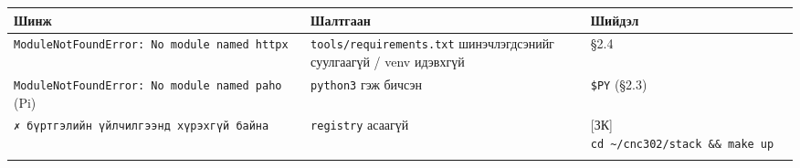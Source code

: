 \begingroup\scriptsize\begin{longtable}[]{@{}lll@{}}
\toprule
\begin{minipage}[b]{0.30\columnwidth}\raggedright
Шинж\strut
\end{minipage} & \begin{minipage}[b]{0.30\columnwidth}\raggedright
Шалтгаан\strut
\end{minipage} & \begin{minipage}[b]{0.30\columnwidth}\raggedright
Шийдэл\strut
\end{minipage}\tabularnewline
\midrule
\endhead
\begin{minipage}[t]{0.30\columnwidth}\raggedright
\texttt{ModuleNotFoundError:\ No\ module\ named\ \textquotesingle{}httpx\textquotesingle{}}\strut
\end{minipage} & \begin{minipage}[t]{0.30\columnwidth}\raggedright
\texttt{tools/\allowbreak{}requirements.\allowbreak{}txt} шинэчлэгдсэнийг суулгаагүй / venv идэвхгүй\strut
\end{minipage} & \begin{minipage}[t]{0.30\columnwidth}\raggedright
§2.4\strut
\end{minipage}\tabularnewline
\begin{minipage}[t]{0.30\columnwidth}\raggedright
\texttt{ModuleNotFoundError:\ No\ module\ named\ \textquotesingle{}paho\textquotesingle{}} (Pi)\strut
\end{minipage} & \begin{minipage}[t]{0.30\columnwidth}\raggedright
\texttt{python3} гэж бичсэн\strut
\end{minipage} & \begin{minipage}[t]{0.30\columnwidth}\raggedright
\texttt{\$PY} (§2.3)\strut
\end{minipage}\tabularnewline
\begin{minipage}[t]{0.30\columnwidth}\raggedright
\texttt{✗\ бүртгэлийн\ үйлчилгээнд\ хүрэхгүй\ байна}\strut
\end{minipage} & \begin{minipage}[t]{0.30\columnwidth}\raggedright
\texttt{registry} асаагүй\strut
\end{minipage} & \begin{minipage}[t]{0.30\columnwidth}\raggedright
{[}ЗК{]} \texttt{cd\ \textasciitilde{}/cnc302/stack\ \&\&\ make\ up}\strut
\end{minipage}\tabularnewline
\begin{minipage}[t]{0.30\columnwidth}\raggedright

\end{minipage}
\end{longtable}
